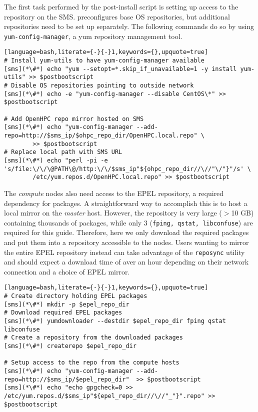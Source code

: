 
The first task performed by the post-install script is setting up access to
the \OHPC{} repository on the SMS. \xCAT{} preconfigures base OS repositories, but
additional repositories need to be set up separately. The following commands do
so by using \texttt{yum-config-manager}, a yum repository management tool.

\begin{lstlisting}[language=bash,literate={-}{-}1,keywords={},upquote=true]
# Install yum-utils to have yum-config-manager available
[sms](*\#*) echo "yum --setopt=*.skip_if_unavailable=1 -y install yum-utils" >> $postbootscript
# Disable OS repositories pointing to outside network
[sms](*\#*) echo -e "yum-config-manager --disable CentOS\*" >> $postbootscript

# Add OpenHPC repo mirror hosted on SMS
[sms](*\#*) echo "yum-config-manager --add-repo=http://$sms_ip/$ohpc_repo_dir/OpenHPC.local.repo" \
        >> $postbootscript
# Replace local path with SMS URL
[sms](*\#*) echo "perl -pi -e 's/file:\/\/\@PATH\@/http:\/\/$sms_ip"${ohpc_repo_dir//\//"\/"}"/s' \
        /etc/yum.repos.d/OpenHPC.local.repo" >> $postbootscript
\end{lstlisting}


The {\em compute} nodes also need access to the EPEL repository, a required
dependency for \OHPC{} packages. A straightforward way to accomplish this is to
host a local mirror on the {\em master} host. However, the repository is very
large ($>$10 GB) containing thousands of packages, while only 3 (\texttt{fping,
qstat, libconfuse}) are required for this guide.  Therefore, here we only
download the required packages and put them into a repository accessible to the
nodes.  Users wanting to mirror the entire EPEL repository instead can take
advantage of the \texttt{reposync} utility and should expect a download time of
aver an hour depending on their network connection and a choice of EPEL mirror.

\begin{lstlisting}[language=bash,literate={-}{-}1,keywords={},upquote=true]
# Create directory holding EPEL packages
[sms](*\#*) mkdir -p $epel_repo_dir
# Download required EPEL packages
[sms](*\#*) yumdownloader --destdir $epel_repo_dir fping qstat libconfuse
# Create a repository from the downloaded packages
[sms](*\#*) createrepo $epel_repo_dir

# Setup access to the repo from the compute hosts
[sms](*\#*) echo "yum-config-manager --add-repo=http://$sms_ip/$epel_repo_dir"  >> $postbootscript
[sms](*\#*) echo "echo gpgcheck=0 >> /etc/yum.repos.d/$sms_ip"${epel_repo_dir//\//"_"}".repo" >> $postbootscript
\end{lstlisting}


